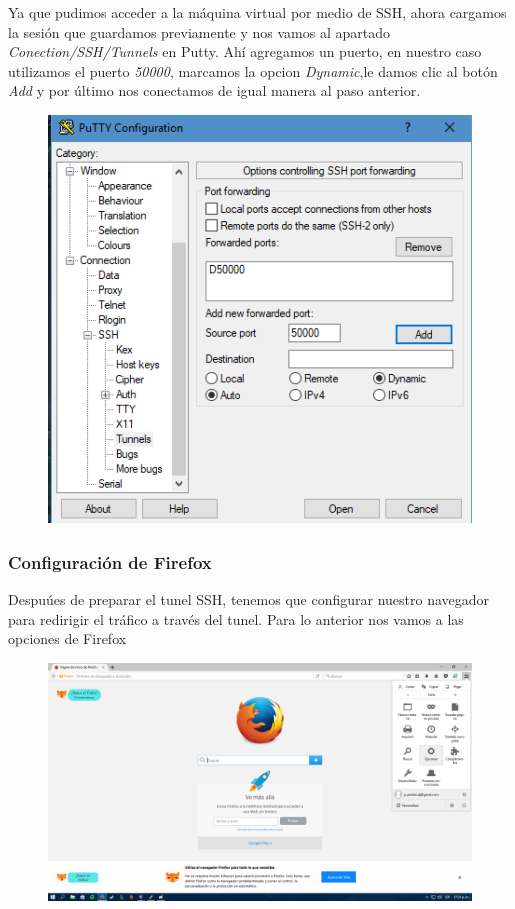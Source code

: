 \documentclass{article}
\begin{document}
Ya que pudimos acceder a la m\'aquina virtual por medio de SSH, ahora cargamos la sesi\'on que guardamos previamente y nos vamos al apartado \emph{Conection/SSH/Tunnels} en Putty. Ah\'i agregamos un puerto, en nuestro caso utilizamos el puerto \emph{50000}, marcamos la opcion \emph{Dynamic},le damos clic al bot\'on \emph{Add} y por \'ultimo nos conectamos de igual manera al paso anterior.

\begin{figure}[H]
\centering
\includegraphics[width=1\textwidth]{10-PUERTO50000}
\end{figure}

\subsubsection{Configuraci\'on de Firefox}

Despu\'ues de preparar el tunel SSH, tenemos que configurar nuestro navegador para redirigir el tr\'afico a trav\'es del tunel. Para lo anterior nos vamos a las opciones de Firefox

\begin{figure}[H]
\centering
\includegraphics[width=1\textwidth]{11-OPCIONESFIREFOX}
\end{figure}
\end{document}
